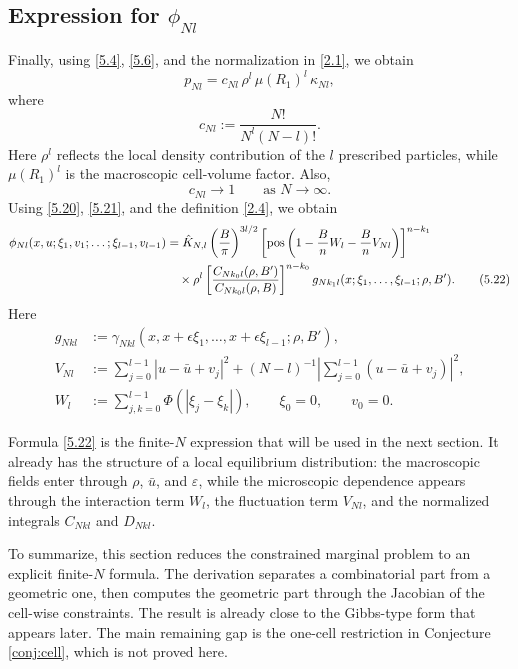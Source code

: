 \documentclass[11pt]{article}
\begin{document}
\subsection{Expression for $\phi_{Nl}$}
Finally, using \eqref{5.4}, \eqref{5.6}, and the normalization in \eqref{2.1}, we obtain
\begin{equation}
p_{Nl}
=
c_{Nl}\,\rho^l\,\mu(R_1)^l\,\kappa_{Nl},
\tag{5.21}\label{5.21}
\end{equation}
where
\[
c_{Nl}:=\frac{N!}{N^l(N-l)!}.
\]
Here $\rho^l$ reflects the local density contribution of the $l$ prescribed particles, while $\mu(R_1)^l$ is the macroscopic cell-volume factor. Also,
\[
c_{Nl}\to 1
\qquad\text{as }N\to\infty.
\]
Using \eqref{5.20}, \eqref{5.21}, and the definition \eqref{2.4}, we obtain
\begin{align}
\phi_{Nl}(x,u;\xi_1,v_1;\dots;\xi_{l-1},v_{l-1})
&=
\hat K_{N,l}
\left(\frac{B}{\pi}\right)^{3l/2}
\left[
\mathrm{pos}
\left(
1-\frac{B}{n}W_l-\frac{B}{n}V_{Nl}
\right)
\right]^{n-k_1}
\notag\\
&\quad\times
\rho^l
\left[
\frac{C_{Nk_0l}(\rho,B')}
     {C_{Nk_0l}(\rho,B)}
\right]^{n-k_0}
g_{Nk_1l}(x;\xi_1,\dots,\xi_{l-1};\rho,B').
\tag{5.22}\label{5.22}
\end{align}
Here
\begin{align*}
g_{Nkl}
&:=
\gamma_{Nkl}(x,x+\epsilon\xi_1,\dots,x+\epsilon\xi_{l-1};\rho,B'),\\
V_{Nl}
&:=
\sum_{j=0}^{l-1}|u-\bar u+v_j|^2
+
(N-l)^{-1}\left|\sum_{j=0}^{l-1}(u-\bar u+v_j)\right|^2,\\
W_l
&:=
\sum_{j,k=0}^{l-1}\Phi(|\xi_j-\xi_k|),
\qquad
\xi_0=0,
\qquad
v_0=0.
\end{align*}

Formula \eqref{5.22} is the finite-$N$ expression that will be used in the next section. It already has the structure of a local equilibrium distribution: the macroscopic fields enter through $\rho$, $\bar u$, and $\varepsilon$, while the microscopic dependence appears through the interaction term $W_l$, the fluctuation term $V_{Nl}$, and the normalized integrals $C_{Nkl}$ and $D_{Nkl}$.

To summarize, this section reduces the constrained marginal problem to an explicit finite-$N$ formula. The derivation separates a combinatorial part from a geometric one, then computes the geometric part through the Jacobian of the cell-wise constraints. The result is already close to the Gibbs-type form that appears later. The main remaining gap is the one-cell restriction in Conjecture \ref{conj:cell}, which is not proved here.
\end{document}
